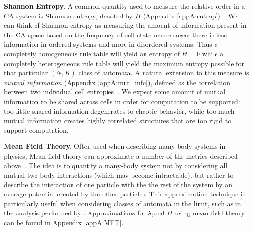 \documentclass[a4paper,11pt]{article}
\begin{document}



\medskip

\noindent \textbf{Shannon Entropy.} A common quantity used to measure the relative order in a CA system is Shannon entropy, denoted by $H$ (Appendix \ref{appA:entrop})~\cite{la90,li90a,wo90}. We can think of Shannon entropy as measuring the amount of information present in the CA space based on the frequency of cell state occurrences; there is less information in ordered systems and more in disordered systems. Thus a completely homogeneous rule table will yield an entropy of $H = 0$ while a completely heterogeneous rule table will yield the maximum entropy possible for that particular $(N,K)$ class of automata. A natural extension to this measure is \textit{mutual information} (Appendix \ref{appA:mut_info}), defined as the correlation between two individual cell entropies~\cite{la90}. We expect some amount of mutual information to be shared across cells in order for computation to be supported: too little shared information degenerates to chaotic behavior, while too much mutual information creates highly correlated structures that are too rigid to support computation.


\medskip

\noindent \textbf{Mean Field Theory.} Often used when describing many-body systems in physics, Mean field theory can approximate a number of the metrics described above~\cite{li90b,wo90}. The idea is to quantify a many-body system not by considering all mutual two-body interactions (which may become intractable), but rather to describe the interaction of one particle with the the rest of the system by an average potential created by the other particles. This approximation technique is particularly useful when considering classes of automata in the limit, such as in the analysis performed by \citeauthor{wo90}. Approximations for $\lambda$,and $H$ using mean field theory can be found in Appendix \ref{appA:MFT}.
\end{document}
